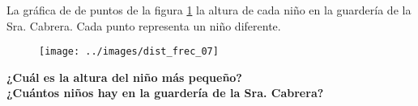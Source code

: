 La gráfica de de puntos de la figura \ref{fig:dist_frec_07}  la altura de cada niño en la guardería de la Sra. Cabrera.
Cada punto representa un niño diferente.
\begin{figure}[H]
    \begin{center}
        \texttt{[image: ../images/dist\_frec\_07]}
    \end{center}
    \caption{}
    \label{fig:dist_frec_07}
\end{figure}
\textbf{¿Cuál es la altura del niño más pequeño?}\\
\textbf{¿Cuántos niños hay en la guardería de la Sra. Cabrera?}

